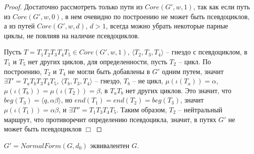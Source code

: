 \begin{proof}
    Достаточно рассмотреть только пути из $Core(G',w,1)$, так как если путь из $Core(G',w,0)$, в нем очевидно 
    по построению не может быть псевдоциклов, а из путей $Core(G',w,d)$, $d > 1$, всегда можно убрать
    некоторые парные циклы, не повлияв на наличие псевдоциклов.

    Пусть $T = T_1 T_2 T_3 T_4 T_5 \in Core(G',w,1)$, $\langle T_2, T_3, T_4 \rangle$ -- гнездо с псевдоциклом,
    в $T_1$ и $T_5$ нет других циклов,
    для определенности, пусть $T_2$ -- цикл.
    По построению, $T_2$ и $T_4$ не могли быть добавлены в $G'$ одним путем, значит 
    $\exists T' = T_a T_b T_3 T_4 T_5$, $\langle T_b, T_3, T_4 \rangle$ -- гнездо, $T_b$ -- не цикл,
    $\mu(\iota(T_a)) = \alpha$,
    $\mu(\iota(T_b)) = \mu(\iota(T_2)) = \beta$,
    в $T_a T_b$ нет других циклов.
    Это значит, что $beg(T_3) = \langle q, \alpha \beta \rangle$, но $end(T_1) = end(T_2) = beg(T_3)$,
    значит $\mu(\iota(T_1)) = \alpha \beta$, и $\exists T'' = T_1 T_3 T_4 T_5$.
    Таким образом, $T_2$ -- нейтральный маршрут, что противоречит определению псевдоцикла, 
    значит, в путях $G'$ не может быть псевдоциклов $\Box$ 
\end{proof}

\begin{theorem}
    $G' = NormalForm(G, d_0)$ эквивалентен $G$.
\end{theorem}

